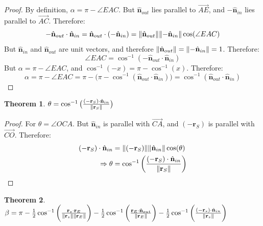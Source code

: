 \documentclass[oneside]{book}
\theoremstyle{mystyle}
\newtheorem{theorem}{Theorem}[section]
\DeclarePairedDelimiter\norm{\lVert}{\rVert}
\begin{document}
\begin{proof}
By definition, $\alpha = \pi - \angle EAC$. But $\hat{\mathbf{n}}_{out}$ lies parallel to $\overrightarrow{AE}$, and $-\hat{\mathbf{n}}_{in}$ lies parallel to $\overrightarrow{AC}$. Therefore:
\begin{equation*}
-\hat{\mathbf{n}}_{out}\cdot \hat{\mathbf{n}}_{in} = \hat{\mathbf{n}}_{out}\cdot (-\hat{\mathbf{n}}_{in}) = \norm{\hat{\mathbf{n}}_{out}}\norm{-\hat{\mathbf{n}}_{in}}\cos(\angle EAC)
\end{equation*}
But $\hat{\mathbf{n}}_{in}$ and $\hat{\mathbf{n}}_{out}$ are unit vectors, and therefore $\norm{\hat{\mathbf{n}}_{out}} = \norm{-\hat{\mathbf{n}}_{in}} = 1$. Therefore:
\begin{equation*}
    \angle EAC = \cos^{-1}(-\hat{\mathbf{n}}_{out}\cdot\hat{\mathbf{n}}_{in})
\end{equation*}
But $\alpha = \pi - \angle EAC$, and $\cos^{-1}(-x) = \pi - \cos^{-1}(x)$. Therefore:
\begin{equation*}
    \alpha = \pi - \angle EAC = \pi - \big(\pi - \cos^{-1}(\hat{\mathbf{n}}_{out}\cdot \hat{\mathbf{n}}_{in})\big) = \cos^{-1}(\hat{\mathbf{n}}_{out}\cdot \hat{\mathbf{n}}_{in})
\end{equation*}
\end{proof}
\begin{theorem}
$\theta = \cos^{-1}\big(\frac{(-\mathbf{r}_{S})\cdot \hat{\mathbf{n}}_{in}}{\norm{\mathbf{r}_{S}}}\big)$
\end{theorem}
\begin{proof}
For $\theta = \angle OCA$. But $\hat{\mathbf{n}}_{in}$ is parallel with $\overrightarrow{CA}$, and $(-\mathbf{r}_{S})$ is parallel with $\overrightarrow{CO}$. Therefore:
\begin{align*}
    (-\mathbf{r}_{S})\cdot \hat{\mathbf{n}}_{in} &= \norm{(-\mathbf{r}_{S})}\norm{\hat{\mathbf{n}}_{in}}\cos(\theta)\\
    \Rightarrow \theta &= \cos^{-1}\bigg(\frac{(-\mathbf{r}_{S})\cdot \hat{\mathbf{n}}_{in}}{\norm{\mathbf{r}_{S}}}\bigg)
\end{align*}
\end{proof}
\begin{theorem}
$\beta = \pi - \frac{1}{2}\cos^{-1}\bigg(\frac{\mathbf{r}_{s}\cdot \mathbf{r}_{E}}{\norm{\mathbf{r}_{s}}\norm{\mathbf{r}_{E}}}\bigg) - \frac{1}{2}\cos^{-1}\bigg(\frac{\mathbf{r}_{E}\cdot \hat{\mathbf{n}}_{out}}{\norm{\mathbf{r}_{E}}}\bigg) - \frac{1}{2}\cos^{-1}\bigg(\frac{(-\mathbf{r}_{s})\cdot \hat{\mathbf{n}}_{in}}{\norm{\mathbf{r}_{s}}}\bigg)$
\end{theorem}
\end{document}
